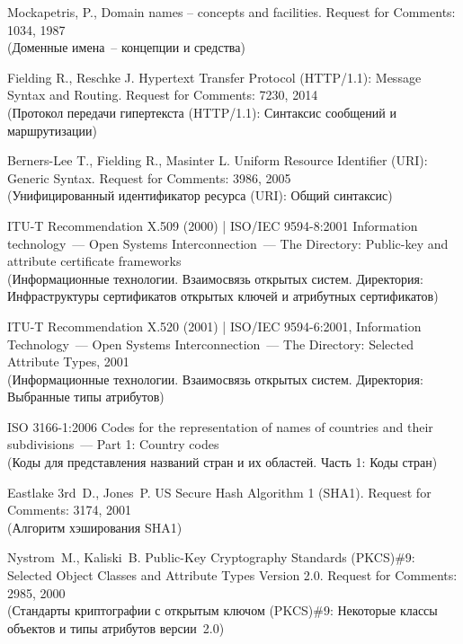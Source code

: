 \clearpage
\renewcommand{\bibname}{Библиография}
\begin{thebibliography}{9}

Mockapetris, P., Domain names -- concepts and facilities. 
Request for Comments: 1034, 1987\\ 
{\small (Доменные имена~-- концепции и средства)} 

Fielding R., Reschke J.
Hypertext Transfer Protocol (HTTP/1.1): Message Syntax and Routing. 
Request for Comments: 7230, 2014\\ 
{\small (Протокол передачи гипертекста (HTTP/1.1): Синтаксис сообщений и 
маршрутизации)}

Berners-Lee T., Fielding R., Masinter L. 
Uniform Resource Identifier (URI): Generic Syntax.  
Request for Comments: 3986, 2005\\
{\small (Унифицированный идентификатор ресурса (URI): Общий синтаксис)}

ITU-T Recommendation X.509 (2000) | ISO/IEC 9594-8:2001
Information technology~--- Open Systems Interconnection~--- 
The Directory: Public-key and attribute certificate frameworks\\
{\small (Информационные технологии. Взаимосвязь открытых систем.
Директория: Инфраструктуры сертификатов открытых ключей и атрибутных 
сертификатов)} 

ITU-T Recommendation X.520 (2001) | ISO/IEC 9594-6:2001,
Information Technology~--- Open Systems Interconnection~---
The Directory: Selected Attribute Types, 2001\\
{\small (Информационные технологии. Взаимосвязь открытых систем.
Директория: Выбранные типы атрибутов)}

ISO 3166-1:2006 Codes for the representation of names of countries and 
their subdivisions~--- Part 1: Country codes\\
{\small (Коды для представления названий стран и их областей. Часть 1: 
Коды стран)} 

Eastlake 3rd~D., Jones~P.
US Secure Hash Algorithm 1 (SHA1). 
Request for Comments: 3174, 2001\\   
{\small (Алгоритм хэширования SHA1)}

Nystrom~M., Kaliski~B. 
Public-Key Cryptography Standards (PKCS)\#9: 
Selected Object Classes and Attribute Types Version 2.0. Request for 
Comments: 2985, 2000\\ 
{\small (Стандарты криптографии с открытым ключом (PKCS)\#9: 
Некоторые классы объектов и типы атрибутов версии~2.0)}  


\end{thebibliography}
